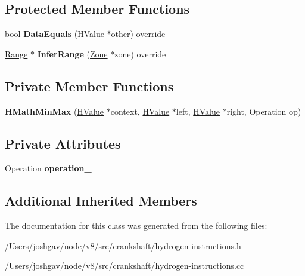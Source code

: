 \subsection*{Protected Member Functions}
\begin{DoxyCompactItemize}
\item 
bool {\bfseries Data\+Equals} (\hyperlink{classv8_1_1internal_1_1_h_value}{H\+Value} $\ast$other) override\hypertarget{classv8_1_1internal_1_1_h_math_min_max_ad2dc8fe4c53552d74a564592afbfc0b8}{}\label{classv8_1_1internal_1_1_h_math_min_max_ad2dc8fe4c53552d74a564592afbfc0b8}

\item 
\hyperlink{classv8_1_1internal_1_1_range}{Range} $\ast$ {\bfseries Infer\+Range} (\hyperlink{classv8_1_1internal_1_1_zone}{Zone} $\ast$zone) override\hypertarget{classv8_1_1internal_1_1_h_math_min_max_ab9883322ad635ad1e28ff26b46a80290}{}\label{classv8_1_1internal_1_1_h_math_min_max_ab9883322ad635ad1e28ff26b46a80290}

\end{DoxyCompactItemize}
\subsection*{Private Member Functions}
\begin{DoxyCompactItemize}
\item 
{\bfseries H\+Math\+Min\+Max} (\hyperlink{classv8_1_1internal_1_1_h_value}{H\+Value} $\ast$context, \hyperlink{classv8_1_1internal_1_1_h_value}{H\+Value} $\ast$left, \hyperlink{classv8_1_1internal_1_1_h_value}{H\+Value} $\ast$right, Operation op)\hypertarget{classv8_1_1internal_1_1_h_math_min_max_ac7771e49775033d021872ad021657ac2}{}\label{classv8_1_1internal_1_1_h_math_min_max_ac7771e49775033d021872ad021657ac2}

\end{DoxyCompactItemize}
\subsection*{Private Attributes}
\begin{DoxyCompactItemize}
\item 
Operation {\bfseries operation\+\_\+}\hypertarget{classv8_1_1internal_1_1_h_math_min_max_a0c9b082d5400aec0914d8dc7d60ee665}{}\label{classv8_1_1internal_1_1_h_math_min_max_a0c9b082d5400aec0914d8dc7d60ee665}

\end{DoxyCompactItemize}
\subsection*{Additional Inherited Members}


The documentation for this class was generated from the following files\+:\begin{DoxyCompactItemize}
\item 
/\+Users/joshgav/node/v8/src/crankshaft/hydrogen-\/instructions.\+h\item 
/\+Users/joshgav/node/v8/src/crankshaft/hydrogen-\/instructions.\+cc\end{DoxyCompactItemize}
